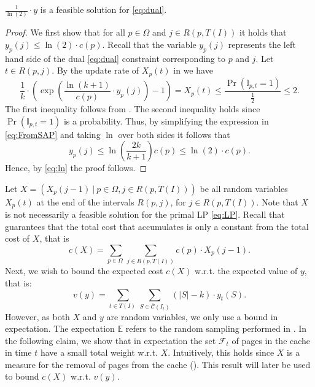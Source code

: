 \documentclass[11pt]{article}
\newcommand{\op}{{\mathbb{I}_{p,t}}}
\newcommand{\cF}{{\mathcal{F}}}
\newcommand{\cC}{{\mathcal{C}}}
\newcommand{\E}{{\mathbb{E}}}
\newcommand{\om}{{\Omega}}
\newcommand{\bbc}{{\bar{\cC}(I_t)}}
\begin{document}
{	\begin{lemma}
	\label{lem:dualF}
$\frac{1}{\ln(2)} \cdot y$ is a feasible solution for \eqref{eq:dual}. 
\end{lemma}

\begin{proof}
We first show that for all  $p \in \om$ and $j \in R(p,T(I))$ it holds that $y_p(j) \leq \ln (2) \cdot c(p)$. Recall that the variable $y_p(j)$ represents the left hand side of the dual \eqref{eq:dual} constraint corresponding to $p$ and $j$. Let $t \in R(p,j)$. By the update rate of $X_p(t)$ in  we have
	\begin{equation}
		\label{eq:FromSAP}
		  \frac{1}{k} \cdot \left(     \exp \left(  \frac{\ln (k+1)}{c(p)} \cdot y_p(j)\right)-1\right) = X_p(t) \leq  \frac{\Pr \left(   \op = 1 \right)}{\frac{1}{2}} \leq 2. 
	\end{equation} 	The first inequality follows from . The second inequality holds since $\Pr \left(   \op = 1 \right)$ is a probability. Thus, by simplifying the expression in \eqref{eq:FromSAP} and taking $\ln$ over both sides it follows that 
	\begin{equation}
		\label{eq:ln}
		y_p(j) \leq \ln \left( \frac{2k}{k+1} \right) c(p) \leq \ln (2) \cdot c(p).  
	\end{equation}  Hence, by \eqref{eq:ln} the proof follows. 
\end{proof}


Let $X = \left( X_p(j-1)~|~p \in \om, j \in R(p,T(I))\right)$ be all random variables $X_p(t)$ at the end of the intervals $R(p,j)$, for $j \in R(p,T(I))$. Note that $X$ is not necessarily a feasible solution for the primal LP \eqref{eq:LP}. Recall that  guarantees that the total cost that  accumulates is only a constant from the total cost of $X$, that is $$c(X) = \sum_{p \in \om~} \sum_{j \in R(p,T(I))} c(p) \cdot X_p(j-1).$$
Next, we wish to bound the expected cost $c(X)$ w.r.t. the expected value of $y$, that is:
$$v(y) = \sum_{t \in T(I)~} \sum_{S \in \bbc} \left( |S|-k \right) \cdot y_t(S).$$
However, as both $X$ and $y$ are random variables, we only use a bound in expectation. The expectation $\E$ refers to the random sampling performed in . In the following claim, we show that in expectation the set $\cF_t$ of pages in the cache in time $t$ have a small total weight w.r.t. $X$. Intuitively, this holds since $X$ is a measure for the removal of pages from the cache (). This result will later be used to bound $c(X)$ w.r.t. $v(y)$. 

}
\end{document}
